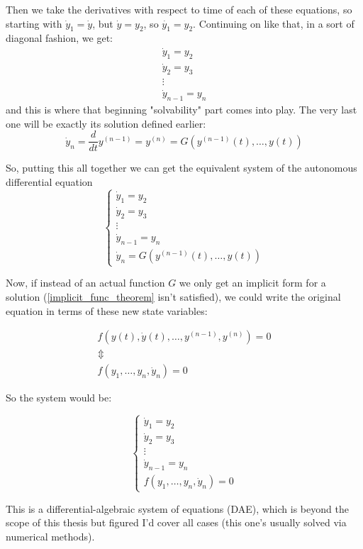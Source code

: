 Then we take the derivatives with respect to time of each of these equations, so starting with $\dot{y}_1 = \dot{y}$, but $\dot{y} = y_2$, so $\dot{y_1}=y_2$. Continuing on like that, in a sort of diagonal fashion, we get:
\begin{gather*}
  \dot{y}_1 = y_2 \\
  \dot{y}_2 = y_3 \\
  \vdots \\
  \dot{y}_{n-1} = y_n
\end{gather*}
and this is where that beginning "solvability" part comes into play. The very last one will be exactly its solution defined earlier:
\[
  \dot{y}_n = \frac{d}{dt}y^{(n-1)} = y^{(n)}  = G(y^{(n-1)}(t), \dots, y(t))
\]

So, putting this all together we can get the equivalent system of the autonomous differential equation
\[
  \begin{cases}
    \dot{y}_1 = y_2     \\
    \dot{y}_2 = y_3     \\
    \vdots              \\
    \dot{y}_{n-1} = y_n \\
    \dot{y}_n  = G(y^{(n-1)}(t), \dots, y(t))
  \end{cases}
\]

Now, if instead of an actual function $G$ we only get an implicit form for a solution (\ref{implicit_func_theorem} isn't satisfied), we could write the original equation in terms of these new state variables:

\begin{gather*}
  f(y(t), \dot{y}(t),\dots,y^{(n-1)},y^{(n)})= 0 \\
  \Updownarrow \\
  f(y_1,\dots,y_n,\dot{y}_n) = 0
\end{gather*}

So the system would be:

\[
  \begin{cases}
    \dot{y}_1 = y_2     \\
    \dot{y}_2 = y_3     \\
    \vdots              \\
    \dot{y}_{n-1} = y_n \\
    f(y_1,\dots,y_n,\dot{y}_n) = 0
  \end{cases}
\]

This is a differential-algebraic system of equations (DAE), which is beyond the scope of this thesis but figured I'd cover all cases (this one's usually solved via numerical methods).

